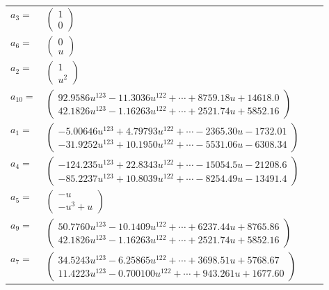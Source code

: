 \documentclass[1p]{elsarticle_modified}
\theoremstyle{definition}
\begin{document}
\begin{tabular}{m{7pt} m{180pt} m{7pt} m{180pt} }
\flushright $a_{3}=$&$\begin{pmatrix}1\\0\end{pmatrix}$ \\
\flushright $a_{6}=$&$\begin{pmatrix}0\\u\end{pmatrix}$ \\
\flushright $a_{2}=$&$\begin{pmatrix}1\\u^2\end{pmatrix}$ \\
\flushright $a_{10}=$&$\begin{pmatrix}92.9586 u^{123}-11.3036 u^{122}+\cdots+8759.18 u+14618.0\\42.1826 u^{123}-1.16263 u^{122}+\cdots+2521.74 u+5852.16\end{pmatrix}$ \\
\flushright $a_{1}=$&$\begin{pmatrix}-5.00646 u^{123}+4.79793 u^{122}+\cdots-2365.30 u-1732.01\\-31.9252 u^{123}+10.1950 u^{122}+\cdots-5531.06 u-6308.34\end{pmatrix}$ \\
\flushright $a_{4}=$&$\begin{pmatrix}-124.235 u^{123}+22.8343 u^{122}+\cdots-15054.5 u-21208.6\\-85.2237 u^{123}+10.8039 u^{122}+\cdots-8254.49 u-13491.4\end{pmatrix}$ \\
\flushright $a_{5}=$&$\begin{pmatrix}- u\\- u^3+u\end{pmatrix}$ \\
\flushright $a_{9}=$&$\begin{pmatrix}50.7760 u^{123}-10.1409 u^{122}+\cdots+6237.44 u+8765.86\\42.1826 u^{123}-1.16263 u^{122}+\cdots+2521.74 u+5852.16\end{pmatrix}$ \\
\flushright $a_{7}=$&$\begin{pmatrix}34.5243 u^{123}-6.25865 u^{122}+\cdots+3698.51 u+5768.67\\11.4223 u^{123}-0.700100 u^{122}+\cdots+943.261 u+1677.60\end{pmatrix}$ \\

\end{tabular}
\end{document}
